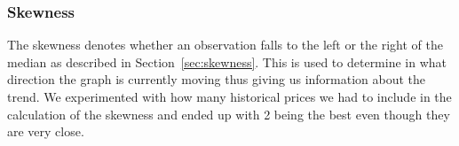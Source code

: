 \begin{table}[H]
\centering  %
\caption{Smoothing factor test} %
\label{table:SmoothingFactorTest} %
\end{table}

\subsubsection{Skewness}
The skewness denotes whether an observation falls to the left or the right of the median as described in Section~\ref{sec:skewness}. This is used to determine in what direction the graph is currently moving thus giving us information about the trend. We experimented with how many historical prices we had to include in the calculation of the skewness and ended up with 2 being the best even though they are very close.

